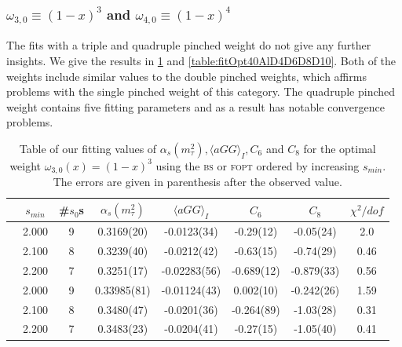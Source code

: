 \documentclass[../../index.tex]{subfiles}
\begin{document}
\subsubsection{\( \omega_{3,0} \equiv (1-x)^3\) and \(\omega_{4,0} \equiv
  (1-x)^4\)}
The fits with a triple and quadruple pinched weight do not give any further
insights. We give the results in \cref{table:fitOpt30AlD4D6D8} and
\cref{table:fitOpt40AlD4D6D8D10}. Both of the weights include similar values to
the double pinched weights, which affirms problems with the single pinched
weight of this category. The quadruple pinched weight contains five fitting
parameters and as a result has notable convergence problems.
\begin{table}
  \centering
  \begin{tabular}{cccccccc}
    \toprule
    & \(s_{min}\) & \#\(s_0\)s & \(\alpha_s(m_\tau^2)\) & \(\langle aGG \rangle_I\) & \(C_{6}\) & \(C_{8}\) & \(\chi^2/dof\)  \\
    \midrule
    \parbox[t]{2mm}{}
    & 2.000 & 9 & 0.3169(20) & -0.0123(34) & -0.29(12) & -0.05(24) & 2.0 \\
    & 2.100 & 8 & 0.3239(40) & -0.0212(42) & -0.63(15) & -0.74(29) & 0.46 \\
    & 2.200 & 7 & 0.3251(17) & -0.02283(56) & -0.689(12) & -0.879(33) & 0.56 \\
    \midrule
    \parbox[t]{2mm}{}
    & 2.000 & 9  & 0.33985(81) & -0.01124(43) & 0.002(10) & -0.242(26) & 1.59 \\
    & 2.100 & 8  & 0.3480(47) & -0.0201(36) & -0.264(89) & -1.03(28) & 0.31 \\
    & 2.200 & 7  & 0.3483(23) & -0.0204(41) & -0.27(15) & -1.05(40) & 0.41 \\
    \bottomrule
  \end{tabular}
  \caption{Table of our fitting values of \(\alpha_s(m_\tau^2), \langle aGG
    \rangle_I, C_6\) and \(C_{8}\) for the optimal weight
    \(\omega_{3,0}(x)=(1-x)^3\) using the \textsc{bs} or \textsc{fopt} ordered by
    increasing \(s_{min}\). The errors are given in parenthesis after the
    observed value.}
  \label{table:fitOpt30AlD4D6D8}
\end{table}
\end{document}
